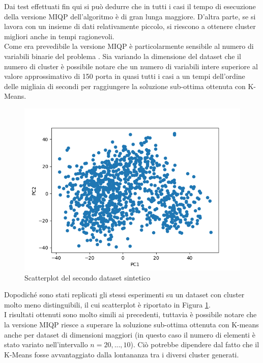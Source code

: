 \documentclass{article}
\begin{document}
    Dai test effettuati fin qui si può dedurre che in tutti i casi il tempo di esecuzione della versione MIQP dell'algoritmo è di gran lunga maggiore. D'altra parte, se si lavora con un insieme di dati relativamente piccolo, si riescono a ottenere cluster migliori anche in tempi ragionevoli.\\
    Come era prevedibile la versione MIQP è particolarmente sensibile al numero di variabili binarie del problema \cite{lapucci}. Sia variando la dimensione del dataset che il numero di cluster è possibile notare che un numero di variabili intere superiore al valore approssimativo di 150 porta in quasi tutti i casi a un tempi dell'ordine delle migliaia di secondi per raggiungere la soluzione sub-ottima ottenuta con K-Means.\\

    \begin{figure}
    \includegraphics[width=1\linewidth]{../results/plots/dataset2}
    \caption{Scatterplot del secondo dataset sintetico}
    \label{fig:wrapfig2}
    \end{figure}
    Dopodiché sono stati replicati gli stessi esperimenti su un dataset con cluster molto meno distinguibili, il cui scatterplot è riportato in Figura \ref{fig:wrapfig2}.\\
    I risultati ottenuti sono molto simili ai precedenti, tuttavia è possibile notare che la versione MIQP riesce a superare la soluzione sub-ottima ottenuta con K-means anche per dataset di dimensioni maggiori (in questo caso il numero di elementi è stato variato nell'intervallo $n=20,...,10$). Ciò potrebbe dipendere dal fatto che il K-Means fosse avvantaggiato dalla lontananza tra i diversi cluster generati.\\
\end{document}
